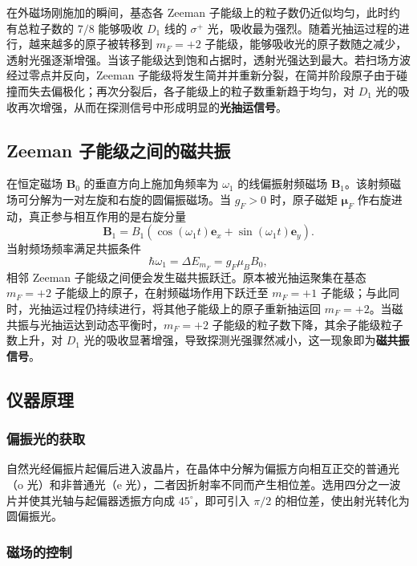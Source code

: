 \documentclass[a4paper, 1.5lines]{ctexart}
\begin{document}
在外磁场刚施加的瞬间，基态各 Zeeman 子能级上的粒子数仍近似均匀，此时约有总粒子数的 $7/8$ 能够吸收 $D_1$ 线的 $\sigma^+$ 光，吸收最为强烈。随着光抽运过程的进行，越来越多的原子被转移到 $m_F=+2$ 子能级，能够吸收光的原子数随之减少，透射光强逐渐增强。当该子能级达到饱和占据时，透射光强达到最大。若扫场方波经过零点并反向，Zeeman 子能级将发生简并并重新分裂，在简并阶段原子由于碰撞而失去偏极化；再次分裂后，各子能级上的粒子数重新趋于均匀，对 $D_1$ 光的吸收再次增强，从而在探测信号中形成明显的\textbf{光抽运信号}。

\subsection{Zeeman 子能级之间的磁共振}

在恒定磁场 $\bm{B}_0$ 的垂直方向上施加角频率为 $\omega_1$ 的线偏振射频磁场 $\bm{B}_1$。该射频磁场可分解为一对左旋和右旋的圆偏振磁场。当 $g_F>0$ 时，原子磁矩 $\bm{\mu}_F$ 作右旋进动，真正参与相互作用的是右旋分量
\[
\bm{B}_1 = B_1\!\left(\cos(\omega_1 t)\bm{e}_x + \sin(\omega_1 t)\bm{e}_y\right) .
\]
当射频场频率满足共振条件
\begin{equation}\label{B_0}
    \hbar \omega_1 = \Delta E_{m_F} = g_F \mu_B B_0 ,
\end{equation}
相邻 Zeeman 子能级之间便会发生磁共振跃迁。原本被光抽运聚集在基态 $m_F=+2$ 子能级上的原子，在射频磁场作用下跃迁至 $m_F=+1$ 子能级；与此同时，光抽运过程仍持续进行，将其他子能级上的原子重新抽运回 $m_F=+2$。当磁共振与光抽运达到动态平衡时，$m_F=+2$ 子能级的粒子数下降，其余子能级粒子数上升，对 $D_1$ 光的吸收显著增强，导致探测光强骤然减小，这一现象即为\textbf{磁共振信号}。

\subsection{仪器原理}

\subsubsection{偏振光的获取}

自然光经偏振片起偏后进入波晶片，在晶体中分解为偏振方向相互正交的普通光（o 光）和非普通光（e 光），二者因折射率不同而产生相位差。选用四分之一波片并使其光轴与起偏器透振方向成 $45^\circ$，即可引入 $\pi/2$ 的相位差，使出射光转化为圆偏振光。

\subsubsection{磁场的控制}
\end{document}
